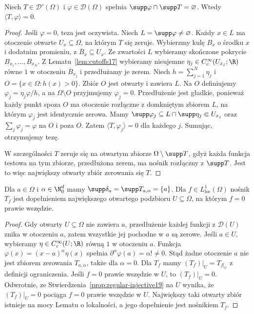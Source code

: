 \begin{lemat}
\label{lem:distribution-local19}
Niech $T\in\mathcal D'(\Omega)$ i
$\varphi\in\mathcal D(\Omega)$ spełnia
$\supp\varphi\cap\supp T=\varnothing$. Wtedy
$\langle T,\varphi\rangle=0$.
\end{lemat}
\begin{proof}
Jeśli $\varphi=0$, teza jest oczywista.
Niech $L=\supp\varphi\ne\varnothing$.
Każdy $x\in L$ ma otoczenie otwarte $U_x\subseteq\Omega$,
na którym $T$ się zeruje. Wybierzmy kulę $B_x$
o środku $x$ i dodatnim promieniu, z $\overline B_x\subseteq U_x$.
Ze zwartości $L$ wybieramy skończone pokrycie
$B_{x_1},\ldots,B_{x_N}$.
Z Lematu~\ref{lem:cutoffs17} wybieramy nieujemne
$\eta_j\in C_c^\infty(U_{x_j};\R)$ równe $1$
w otoczeniu $\overline B_{x_j}$ i przedłużamy je zerem.
Niech $h=\sum_{j=1}^N\eta_j$ i $O=\{x\in\Omega:h(x)>0\}$.
Zbiór $O$ jest otwarty i zawiera $L$.
Na $O$ definiujemy $\varphi_j=\eta_j\varphi/h$,
a na $\Omega\setminus O$ przyjmujemy $\varphi_j=0$.
Przedłużenie jest gładkie, ponieważ każdy punkt spoza $O$
ma otoczenie rozłączne z domkniętym zbiorem $L$,
na którym $\varphi_j$ jest identycznie zerowa.
Mamy $\supp\varphi_j\subseteq L\cap\supp\eta_j\Subset U_{x_j}$
oraz $\sum_j\varphi_j=\varphi$ na $O$ i poza $O$.
Zatem $\langle T,\varphi_j\rangle=0$ dla każdego $j$.
Sumując, otrzymujemy tezę.

W szczególności $T$ zeruje się na otwartym zbiorze
$\Omega\setminus\supp T$, gdyż każda funkcja testowa
na tym zbiorze, przedłużona zerem, ma nośnik rozłączny
z $\supp T$. Jest to więc największy otwarty zbiór
zerowania się $T$.
\end{proof}

\begin{stwierdzenie}
\label{prop:support-examples19}
Dla $a\in\Omega$ i $\alpha\in\N_0^d$ mamy
$\supp\delta_a=\supp T_{a,\alpha}=\{a\}$.
Dla $f\in L^1_{\mathrm{loc}}(\Omega)$ nośnik $T_f$
jest dopełnieniem największego otwartego podzbioru
$U\subseteq\Omega$, na którym $f=0$ prawie wszędzie.
\end{stwierdzenie}
\begin{proof}
Gdy otwarty $U\subseteq\Omega$ nie zawiera $a$,
przedłużenie każdej funkcji z $\mathcal D(U)$ znika
w otoczeniu $a$, zatem wszystkie jej pochodne w $a$ są zerowe.
Jeśli $a\in U$, wybieramy $\eta\in C_c^\infty(U;\R)$
równą $1$ w otoczeniu $a$. Funkcja
$\varphi(x)=(x-a)^\alpha\eta(x)$ spełnia
$\partial^\alpha\varphi(a)=\alpha!\ne0$.
Stąd żadne otoczenie $a$ nie jest zbiorem zerowania
$T_{a,\alpha}$, także dla $\alpha=0$.
Dla $T_f$ mamy $(T_f)|_U=T_{f|_U}$ z definicji ograniczenia.
Jeśli $f=0$ prawie wszędzie w $U$, to $(T_f)|_U=0$.
Odwrotnie, ze Stwierdzenia~\ref{prop:regular-injective19}
na $U$ wynika, że $(T_f)|_U=0$ pociąga $f=0$ prawie wszędzie w $U$.
Największy taki otwarty zbiór istnieje na mocy Lematu
o lokalności, a jego dopełnienie jest nośnikiem $T_f$.
\end{proof}

